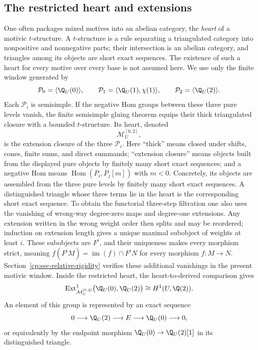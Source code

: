 \subsection{The restricted heart and extensions}
\label{cp:subsec-restricted-heart}

One often packages mixed motives into an abelian category, the \emph{heart}
of a motivic \(t\)-structure.  A \(t\)-structure is a rule separating a
triangulated category into nonpositive and nonnegative parts; their
intersection is an abelian category, and triangles among its objects are
short exact sequences.  The existence of such a heart for every
motive over every base is not assumed here.  We use only the finite window
generated by
\begin{equation}
 \mathcal P_0=\langle\Q_U(0)\rangle,\qquad
 \mathcal P_1=\langle\Q_U(1),\chi(1)\rangle,\qquad
 \mathcal P_2=\langle\Q_U(2)\rangle.
 \label{cp:eq-pure-three-levels}
\end{equation}
Each \(\mathcal P_i\) is semisimple.  If the negative Hom groups between
these three pure levels vanish, the finite semisimple gluing theorem equips
their thick triangulated closure with a bounded \(t\)-structure.  Its heart,
denoted
\[
 \mathcal M_U^{[0,2]},
\]
is the extension closure of the three \(\mathcal P_i\).  Here ``thick'' means
closed under shifts, cones, finite sums, and direct summands; ``extension
closure'' means objects built from the displayed pure objects by finitely
many short exact sequences; and a negative Hom means
\(\operatorname{Hom}(P_i,P_j[m])\) with \(m<0\).  Concretely, its
objects are assembled from the three pure levels by finitely many short exact
sequences.  A distinguished triangle whose three terms lie in the heart is
the corresponding short exact sequence.  To obtain the functorial
three-step filtration one also uses the vanishing of wrong-way
degree-zero maps and degree-one extensions.  Any extension written in the
wrong weight order then splits and may be reordered; induction on extension
length gives a unique maximal subobject of weights at least \(i\).  These
subobjects are \(F^i\), and their uniqueness makes every morphism strict,
meaning \(f(F^iM)=\operatorname{im}(f)\cap F^iN\) for every morphism
\(f:M\to N\).
Section~\ref{cp:sec-relative-rigidity} verifies these additional vanishings
in the present motivic window.
Inside the restricted heart, the heart-to-derived comparison gives
\begin{equation}
 \operatorname{Ext}^1_{\mathcal M_U^{[0,2]}}
   \bigl(\Q_U(0),\Q_U(2)\bigr)
 \cong H^1(U,\Q(2)).
 \label{cp:eq-ext-is-motivic-cohomology}
\end{equation}
An element of this group is represented by an exact sequence
\[
 0\longrightarrow\Q_U(2)\longrightarrow E\longrightarrow
 \Q_U(0)\longrightarrow0,
\]
or equivalently by the endpoint morphism
\(\Q_U(0)\to\Q_U(2)[1]\) in its distinguished triangle.

